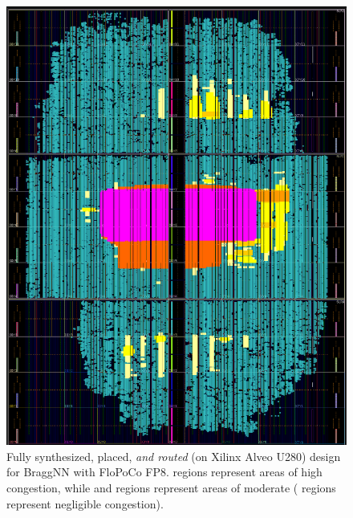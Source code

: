 \begin{figure}
	\includegraphics[width=\columnwidth]{figures/sfp_congestion.png}
	\caption{Fully synthesized, placed, \emph{and routed} (on Xilinx Alveo U280) design for BraggNN with FloPoCo FP8. \crule[magenta]{0.25cm}{0.25cm} regions represent areas of high congestion, while \crule[orange]{0.25cm}{0.25cm} and \crule[yellow]{0.25cm}{0.25cm} regions represent areas of moderate (\crule[teal]{0.25cm}{0.25cm} regions represent negligible congestion).}\label{fig:congestion_alveo}
\end{figure}